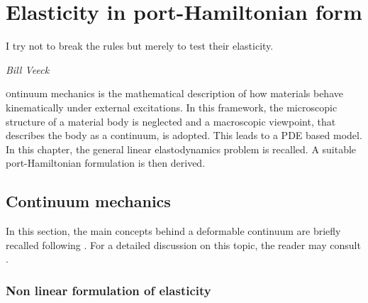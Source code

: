 \chapter{Elasticity in port-Hamiltonian form}

\epigraph{I try not to break the rules but merely to test their elasticity.}{\textit{Bill Veeck}}
\minitoc

\lettrine{\color{theme}{C}}ontinuum mechanics is the mathematical description of how materials behave kinematically under external excitations. In this framework, the microscopic structure of a material body is neglected and a macroscopic viewpoint, that describes the body as a continuum, is adopted. This leads to a PDE based model. In this chapter, the general linear elastodynamics problem is recalled. A suitable port-Hamiltonian formulation is then derived.

\section{Continuum mechanics}
In this section, the main concepts behind a deformable continuum are briefly recalled following \cite{lee2012mixed}. For a detailed discussion on this topic, the reader may consult \cite{abeyaratne2012notes,landau2012elasticity}. 

\subsection{Non linear formulation of elasticity}

